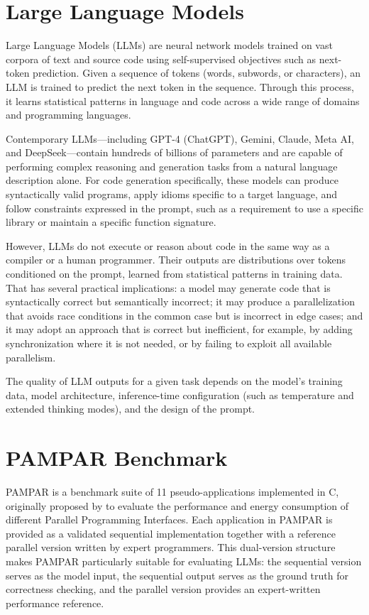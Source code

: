 \section{Large Language Models}
\label{sec:llms}

Large Language Models (LLMs) are neural network models trained on vast corpora of text and source code using self-supervised objectives such as next-token prediction. Given a sequence of tokens (words, subwords, or characters), an LLM is trained to predict the next token in the sequence. Through this process, it learns statistical patterns in language and code across a wide range of domains and programming languages.

Contemporary LLMs—including GPT-4 (ChatGPT), Gemini, Claude, Meta AI, and DeepSeek—contain hundreds of billions of parameters and are capable of performing complex reasoning and generation tasks from a natural language description alone. For code generation specifically, these models can produce syntactically valid programs, apply idioms specific to a target language, and follow constraints expressed in the prompt, such as a requirement to use a specific library or maintain a specific function signature.

However, LLMs do not execute or reason about code in the same way as a compiler or a human programmer. Their outputs are distributions over tokens conditioned on the prompt, learned from statistical patterns in training data. 
That has several practical implications: a model may generate code that is syntactically correct but semantically incorrect; it may produce a parallelization that avoids race conditions in the common case but is incorrect in edge cases; and it may adopt an approach that is correct but inefficient, for example, by adding synchronization where it is not needed, or by failing to exploit all available parallelism.

The quality of LLM outputs for a given task depends on the model's training data, model architecture, inference-time configuration (such as temperature and extended thinking modes), and the design of the prompt.

\section{PAMPAR Benchmark}
\label{sec:pampar}

PAMPAR is a benchmark suite of 11 pseudo-applications implemented in C, originally proposed by  to evaluate the performance and energy consumption of different Parallel Programming Interfaces. 
Each application in PAMPAR is provided as a validated sequential implementation together with a reference parallel version written by expert programmers. 
This dual-version structure makes PAMPAR particularly suitable for evaluating LLMs: the sequential version serves as the model input, the sequential output serves as the ground truth for correctness checking, and the parallel version provides an expert-written performance reference.


